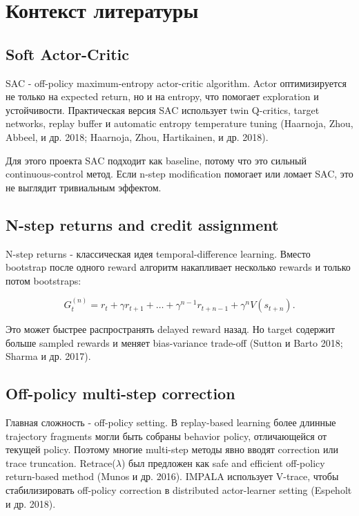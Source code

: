 \documentclass[
  russian,
]{article}
\begin{document}
\section{Контекст
литературы}\label{ux43aux43eux43dux442ux435ux43aux441ux442-ux43bux438ux442ux435ux440ux430ux442ux443ux440ux44b}

\subsection{Soft Actor-Critic}\label{soft-actor-critic}

SAC - off-policy maximum-entropy actor-critic algorithm. Actor
оптимизируется не только на expected return, но и на entropy, что
помогает exploration и устойчивости. Практическая версия SAC использует
twin Q-critics, target networks, replay buffer и automatic entropy
temperature tuning (Haarnoja, Zhou, Abbeel, и др. 2018; Haarnoja, Zhou,
Hartikainen, и др. 2018).

Для этого проекта SAC подходит как baseline, потому что это сильный
continuous-control метод. Если n-step modification помогает или ломает
SAC, это не выглядит тривиальным эффектом.

\subsection{N-step returns and credit
assignment}\label{n-step-returns-and-credit-assignment}

N-step returns - классическая идея temporal-difference learning. Вместо
bootstrap после одного reward алгоритм накапливает несколько rewards и
только потом bootstraps:

\[
G_t^{(n)} = r_t + \gamma r_{t+1} + \dots + \gamma^{n-1} r_{t+n-1} + \gamma^n V(s_{t+n}).
\]

Это может быстрее распространять delayed reward назад. Но target
содержит больше sampled rewards и меняет bias-variance trade-off (Sutton
и Barto 2018; Sharma и др. 2017).

\subsection{Off-policy multi-step
correction}\label{off-policy-multi-step-correction}

Главная сложность - off-policy setting. В replay-based learning более
длинные trajectory fragments могли быть собраны behavior policy,
отличающейся от текущей policy. Поэтому многие multi-step методы явно
вводят correction или trace truncation. Retrace(\(\lambda\)) был
предложен как safe and efficient off-policy return-based method (Munos и
др. 2016). IMPALA использует V-trace, чтобы стабилизировать off-policy
correction в distributed actor-learner setting (Espeholt и др. 2018).
\end{document}
